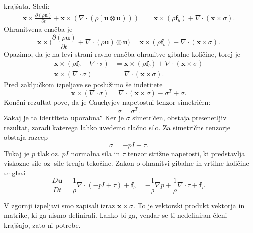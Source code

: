 \documentclass[mat2, tisk]{fmfdelo}
\newcommand{\bd}{\textbf}
\begin{document}
krajšata. Sledi:
\begin{align*}
\bd{x} \times \frac{\partial (\rho\bd{u})}{\partial t} + \bd{x} \times (\nabla\cdot (\rho(\bd{u}\otimes \bd{u}))) &= \bd{x}\times (\rho \bd{f}_b) + \nabla \cdot (\bd{x} \times \sigma). 
\end{align*}
Ohranitvena enačba je
\begin{equation*}
\bd{x} \times \Big(\frac{\partial (\rho\bd{u})}{\partial t} + \nabla\cdot (\rho\bd{u})\otimes \bd{u}\Big) = \bd{x}\times (\rho \bd{f}_b) + \nabla \cdot (\bd{x} \times \sigma).
\end{equation*}
Opazimo, da je na levi strani ravno enačba ohranitve gibalne količine, torej je 
\begin{align*}
\bd{x}\times (\rho \bd{f}_b + \nabla \cdot \sigma) &= \bd{x} \times (\rho \bd{f}_b) + \nabla \cdot (\bd{x} \times \sigma) \\
\bd{x} \times (\nabla \cdot \sigma) &= \nabla \cdot (\bd{x} \times \sigma).
\end{align*}
Pred zaključkom izpeljave se poslužimo še indetitete
$$
\bd{x} \times (\nabla \cdot \sigma) = \nabla \cdot (\bd{x} \times \sigma) - \sigma^T + \sigma.
$$
Končni rezultat pove, da je Cauchyjev napetostni tenzor simetričen:
$$
\sigma = \sigma^T.
$$
Zakaj je ta identiteta uporabna? Ker je $\sigma$ simetričen, obstaja presenetljiv rezultat, zaradi katerega
lahko uvedemo tlačno silo. Za simetrične tenzorje obstaja razcep
$$
\sigma = -pI + \tau.
$$
Tukaj je $p$ tlak oz. $pI$ normalna sila in $\tau$ tenzor strižne napetosti, ki predstavlja viskozne sile oz.
sile trenja tekočine. Zakon o ohranitvi gibalne in vrtilne količine se glasi
\begin{equation*}
\frac{D \bd{u}}{D t} = \frac{1}{\rho} \nabla \cdot (-pI + \tau) + \bd{f}_b = -\frac{1}{\rho} \nabla p + \frac{1}{\rho} \nabla \cdot \tau + \bd{f}_b.
\end{equation*}

\begin{opomba}
V zgornji izpeljavi smo zapisali izraz $\bd{x} \times \sigma$. To je vektorski produkt vektorja in matrike, 
ki ga nismo definirali. Lahko bi ga, vendar se ti nedefiniran členi krajšajo, zato ni potrebe.
\end{opomba}
\end{document}
